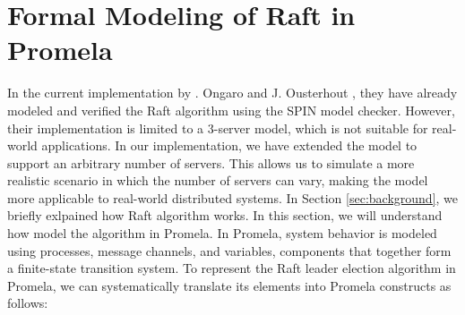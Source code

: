 \documentclass[a4paper]{llncs}
\begin{document}
    \section{Formal Modeling of Raft in Promela}
    \label{sec:formal_modeling}

    In the current implementation by . Ongaro and J. Ousterhout \cite{Qx1}, they have already modeled and verified the Raft algorithm using the SPIN model checker. However, their implementation is limited to a 3-server model,
    which is not suitable for real-world applications. In our implementation, we have extended the model to support an arbitrary number of servers. This allows us to simulate a more realistic scenario in which the number of servers can vary,
    making the model more applicable to real-world distributed systems.
    \newline
In Section \ref{sec:background}, we briefly exlpained how Raft algorithm works. In this section, we will understand how model the algorithm in Promela.
    \newline
    In Promela, system behavior is modeled using processes, message channels, and
variables, components that together form a finite-state transition system. To represent the Raft leader election algorithm in Promela, we can systematically translate its elements into Promela constructs as follows:
\end{document}
